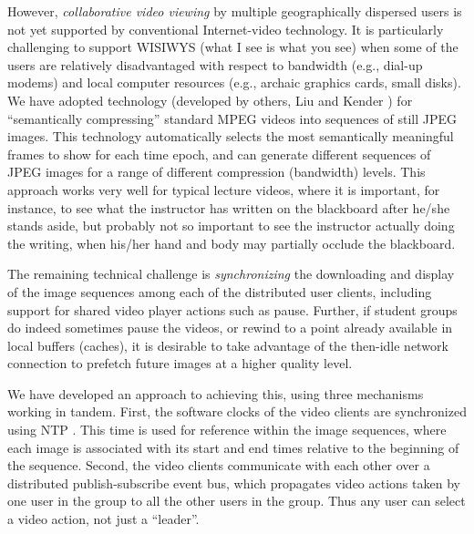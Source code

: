 \documentclass{sig-alternate}
\begin{document}

However, {\em collaborative video viewing} by multiple geographically
dispersed users is not yet supported by conventional Internet-video
technology.  It is particularly challenging to support WISIWYS (what I
see is what you see) when some of the users are relatively
disadvantaged with respect to bandwidth (e.g., dial-up modems) and
local computer resources (e.g., archaic graphics cards, small disks).
We have adopted technology (developed by others, Liu and Kender
\cite{TIECHENG}) for ``semantically compressing'' standard MPEG videos
into sequences of still JPEG images.  This technology automatically
selects the most semantically meaningful frames to show for each time
epoch, and can generate different sequences of JPEG images for a range
of different compression (bandwidth) levels.  This approach works very
well for typical lecture videos, where it is important, for instance,
to see what the instructor has written on the blackboard after he/she
stands aside, but probably not so important to see the instructor
actually doing the writing, when his/her hand and body may partially
occlude the blackboard.

The remaining technical challenge is {\em synchronizing} the
downloading and display of the image sequences among each of the
distributed user clients, including support for shared video player
actions such as pause.  Further, if student groups do indeed sometimes
pause the videos, or rewind to a point already available in local
buffers (caches), it is desirable to take advantage of the then-idle
network connection to prefetch future images at a higher quality
level.

We have developed an approach to achieving this, using three
mechanisms working in tandem.  First, the software clocks of the video
clients are synchronized using NTP \cite{NTP}.  This time is used for
reference within the image sequences, where each image is associated
with its start and end times relative to the beginning of the
sequence.  Second, the video clients communicate with each other over
a distributed publish-subscribe event bus, which propagates video
actions taken by one user in the group to all the other users in the
group.  Thus any user can select a video action, not just a
``leader''.
\end{document}
